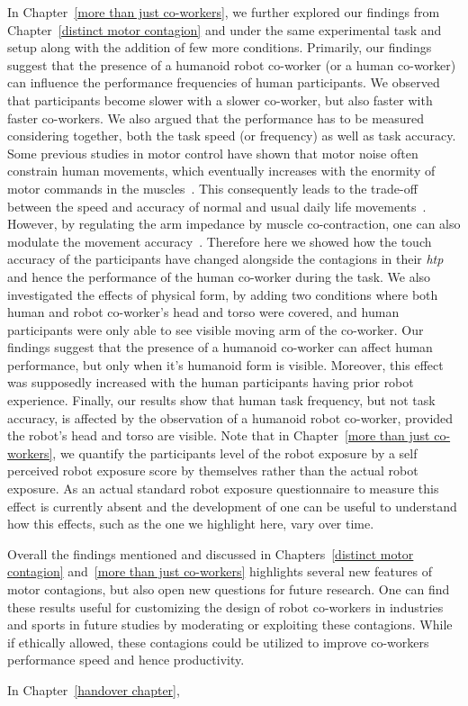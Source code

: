 In Chapter~\ref{more than just co-workers}, we further explored our findings from Chapter~\ref{distinct motor contagion} and under the same experimental task and setup along with the addition of few more conditions. Primarily, our findings suggest that the presence of a humanoid robot co-worker (or a human co-worker) can influence the performance frequencies of human participants. We observed that participants become slower with a slower co-worker, but also faster with faster co-workers. We also argued that the performance has to be measured considering together, both the task speed (or frequency) as well as task accuracy. Some previous studies in motor control have shown that motor noise often constrain human movements, which eventually increases with the enormity of motor commands in the muscles~\cite{Harris:Nature:1998}. This consequently leads to the trade-off between the speed and accuracy of normal and usual daily life movements~\cite{Fitts:JEP:1954}. However, by regulating the arm impedance by muscle co-contraction, one can also modulate the movement accuracy~\cite{Burdet:nature:2001, Franklin:JoN:2008, Ganesh:RAS:2013}. Therefore here we showed how the touch accuracy of the participants have changed alongside the contagions in their {\it htp} and hence the performance of the human co-worker during the task. We also investigated the effects of physical form, by adding two conditions where both human and robot co-worker's head and torso were covered, and human participants were only able to see visible moving arm of the co-worker. Our findings suggest that the presence of a humanoid co-worker can affect human performance, but only when it's humanoid form is visible. Moreover, this effect was supposedly increased with the human participants having prior robot experience. Finally, our results show that human task frequency, but not task accuracy, is affected by the observation of a humanoid robot co-worker, provided the robot's head and torso are visible. Note that in Chapter~\ref{more than just co-workers}, we quantify the participants level of the robot exposure by a self perceived robot exposure score by themselves rather than the actual robot exposure. As an actual standard robot exposure questionnaire to measure this effect is currently absent and the development of one can be useful to understand how this effects, such as the one we highlight here, vary over time.

Overall the findings mentioned and discussed in Chapters~\ref{distinct motor contagion} and~\ref{more than just co-workers} highlights several new features of motor contagions, but also open new questions for future research. One can find these results useful for customizing the design of robot co-workers in industries and sports in future studies by moderating or exploiting these contagions. While if ethically allowed, these contagions could be utilized to improve co-workers performance speed and hence productivity.

In Chapter~\ref{handover chapter},


\clearpage %
\pagestyle{fancy}












